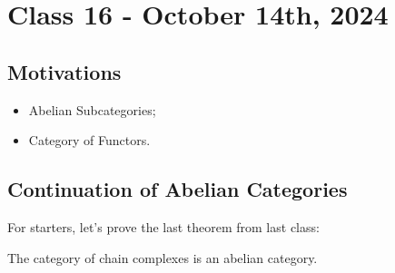 \documentclass[../category_theory.tex]{subfiles}
\begin{document}
\section{Class 16 - October 14th, 2024}
\subsection{Motivations}
\begin{itemize}
	\item Abelian Subcategories;
	\item Category of Functors.
\end{itemize}
\subsection{Continuation of Abelian Categories}
For starters, let's prove the last theorem from last class:
\begin{theorem*}
	The category of chain complexes is an abelian category.
\end{theorem*}
\end{document}

